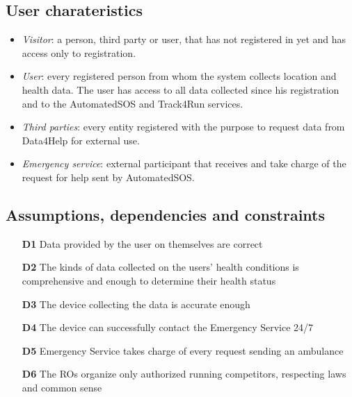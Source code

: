 \subsection{User charateristics}
\begin{itemize}
\item	\textit{Visitor}: a person, third party or user, that has not registered in yet and has access only to registration. 
\item	\textit{User}: every registered person from whom the system collects location and health data. The user has access to all data collected since his registration and to the AutomatedSOS and Track4Run services.
\item	\textit{Third parties}: every entity registered with the purpose to request data from Data4Help for external use. 
\item	\textit{Emergency service}: external participant that receives and take charge of the request for help sent by AutomatedSOS. 
\end{itemize}

\subsection{Assumptions, dependencies and constraints}
\begin{itemize}
\item	[\textbf{D1}] Data provided by the user on themselves are correct
\item	[\textbf{D2}] The kinds of data collected on the users’ health conditions is comprehensive and enough to determine their health status
\item	[\textbf{D3}] The device collecting the data is accurate enough 
\item	[\textbf{D4}] The device can successfully contact the Emergency Service 24/7
\item	[\textbf{D5}] Emergency Service takes charge of every request sending an ambulance
\item	[\textbf{D6}] The ROs organize only authorized running competitors, respecting laws and common sense
\end{itemize}

